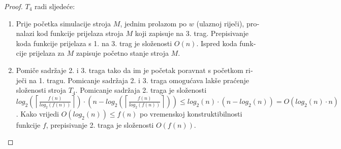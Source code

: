 \documentclass[12pt]{rectors}
\begin{document}
\begin{otherlanguage}{croatian}
\begin{proof}
$T_4$ radi sljedeće:
\begin{enumerate}
    \item Prije početka simulacije stroja $M$, jednim prolazom po $w$ (ulaznoj riječi), pronalazi kod funkcije prijelaza stroja $M$ koji zapisuje na 3. trag.
    Prepisivanje koda funkcije prijelaza s 1. na 3. trag je složenosti $O(n)$. Ispred koda funkcije prijelaza za $M$ zapisuje početno stanje stroja $M$.
    
    \item Pomiče sadržaje 2. i 3. traga tako da im je početak poravnat s početkom riječi na 1. tragu. Pomicanje sadržaja 2. i 3. traga omogućava lakše praćenje složenosti stroja $T_4$.
    Pomicanje sadržaja 2. traga je složenosti \newline $ log_2\left (\left \lceil{ \frac{f(n)}{log_2(f(n))} }\right \rceil \right ) \cdot  \left (n-log_2 \left (\left \lceil{ \frac{f(n)}{log_2(f(n))} }\right \rceil \right ) \right ) \leq log_2(n) \cdot (n-log_2(n)) = O(log_2(n) \cdot n) $. Kako vrijedi $O(log_2(n)) \leq f(n) $ po vremenskoj konstruktibilnosti funkcije $f$, prepisivanje 2. traga je složenosti 
    $O(f(n))$.
    

\end{enumerate}
\end{proof}
\end{otherlanguage}
\end{document}
